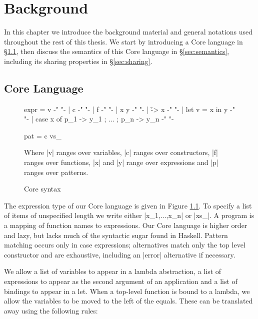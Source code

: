 

\chapter{Background}
\label{chp:background}

In this chapter we introduce the background material and general notations used throughout the rest of this thesis. We start by introducing a Core language in \S\ref{sec:core}, then discuss the semantics of this Core language in \S\ref{sec:semantics}, including its sharing properties in \S\ref{sec:sharing}.

\section{Core Language}
\label{sec:core}

\begin{figure}
\begin{code}
expr  =  v                                          {-"  "-}
      |  c                                          {-"  "-}
      |  f                                          {-"  "-}
      |  x y                                        {-"  "-}
      |  \v -> x                                    {-"  "-}
      |  let v = x in y                             {-"  "-}
      |  case x of {p_1 -> y_1 ; ... ; p_n -> y_n}  {-"  "-}

pat   =  c vs_
\end{code}

Where |v| ranges over variables, |c| ranges over constructors, |f| ranges over functions, |x| and |y| range over expressions and |p| ranges over patterns.
\caption{Core syntax}
\label{fig:core}
\end{figure}

The expression type of our Core language is given in Figure \ref{fig:core}. To specify a list of items of unspecified length we write either |x_1,...,x_n| or |xs_|. A program is a mapping of function names to expressions. Our Core language is higher order and lazy, but lacks much of the syntactic sugar found in Haskell. Pattern matching occurs only in case expressions; alternatives match only the top level constructor and are exhaustive, including an |error| alternative if necessary.

We allow a list of variables to appear in a lambda abstraction, a list of expressions to appear as the second argument of an application and a list of bindings to appear in a let. When a top-level function is bound to a lambda, we allow the variables to be moved to the left of the equals. These can be translated away using the following rules:

